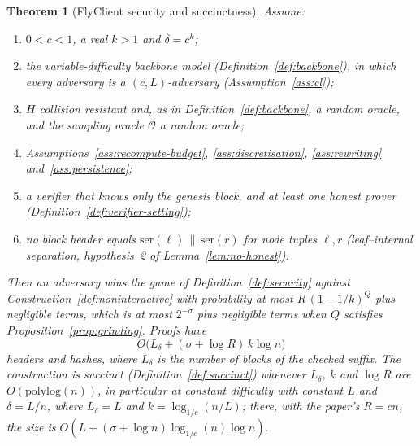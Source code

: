\documentclass[11pt,a4paper]{article}
\newtheorem{theorem}{Theorem}[section]
\theoremstyle{definition}
\begin{document}
\begin{theorem}[FlyClient security and succinctness]\label{thm:flyclient}
Assume:
\begin{enumerate}
\item $0<c<1$, a real $k>1$ and $\delta=c^k$;
\item the variable-difficulty backbone model
  (Definition~\ref{def:backbone}), in which every adversary is a
  $(c,L)$-adversary (Assumption~\ref{ass:cl});
\item $H$ collision resistant and, as in Definition~\ref{def:backbone}, a
  random oracle, and the sampling oracle $\mathcal{O}$ a random oracle;
\item Assumptions~\ref{ass:recompute-budget}, \ref{ass:discretisation},
  \ref{ass:rewriting} and~\ref{ass:persistence};
\item a verifier that knows only the genesis block, and at least one honest
  prover (Definition~\ref{def:verifier-setting});
\item no block header equals $\mathrm{ser}(\ell)\,\|\,\mathrm{ser}(r)$ for
  node tuples $\ell,r$ (leaf--internal separation, hypothesis~2 of
  Lemma~\ref{lem:no-honest}).
\end{enumerate}
Then an adversary wins the game of Definition~\ref{def:security} against
Construction~\ref{def:noninteractive} with probability at most
$R\,(1-1/k)^Q$ plus negligible terms, which is at most $2^{-\sigma}$ plus
negligible terms when $Q$ satisfies Proposition~\ref{prop:grinding}.
Proofs have
\[
  O\bigl(L_\delta+(\sigma+\log R)\,k\log n\bigr)
\]
headers and hashes, where $L_\delta$ is the number of blocks of the checked
suffix. The construction is succinct (Definition~\ref{def:succinct})
whenever $L_\delta$, $k$ and $\log R$ are $O(\mathrm{polylog}(n))$, in
particular at constant difficulty with constant $L$ and $\delta=L/n$, where
$L_\delta=L$ and $k=\log_{1/c}(n/L)$; there, with the paper's $R=cn$, the
size is $O(L+(\sigma+\log n)\log_{1/c}(n)\log n)$.
\end{theorem}
\end{document}
